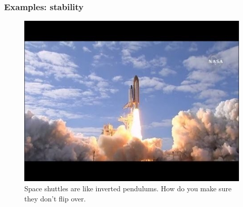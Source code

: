 \begin{frame}
	\frametitle{Examples: stability}
\begin{figure}
\centering
\includegraphics[width=0.7\linewidth]{shuttle}
\caption{Space shuttles are like inverted pendulums. How do you make sure they don't flip over.}
\label{fig:shuttle}
\end{figure}
\end{frame}

